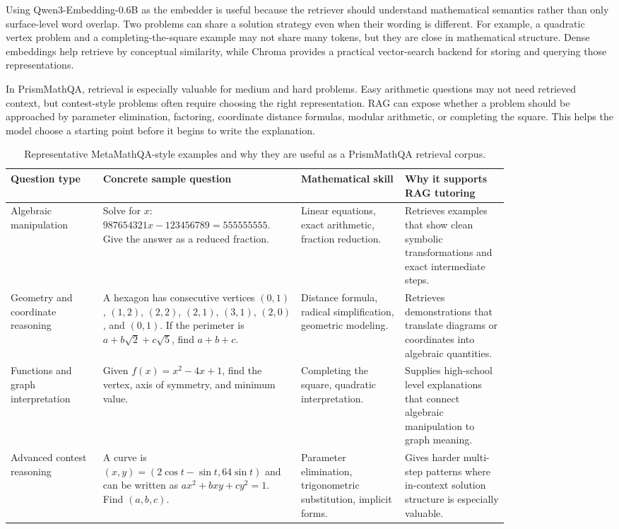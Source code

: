 Using Qwen3-Embedding-0.6B as the embedder is useful because the retriever should understand mathematical semantics rather than only surface-level word overlap. Two problems can share a solution strategy even when their wording is different. For example, a quadratic vertex problem and a completing-the-square example may not share many tokens, but they are close in mathematical structure. Dense embeddings help retrieve by conceptual similarity, while Chroma provides a practical vector-search backend for storing and querying those representations.

In PrismMathQA, retrieval is especially valuable for medium and hard problems. Easy arithmetic questions may not need retrieved context, but contest-style problems often require choosing the right representation. RAG can expose whether a problem should be approached by parameter elimination, factoring, coordinate distance formulas, modular arithmetic, or completing the square. This helps the model choose a starting point before it begins to write the explanation.

\begin{table}[t]
\centering
\caption{Representative MetaMathQA-style examples and why they are useful as a PrismMathQA retrieval corpus.}
\label{tab:metamathqa-corpus}
\small
\begin{tabular}{p{0.16\linewidth}p{0.30\linewidth}p{0.18\linewidth}p{0.18\linewidth}}
\toprule
Question type & Concrete sample question & Mathematical skill & Why it supports RAG tutoring \\
\midrule
Algebraic manipulation & Solve for $x$: $987654321x-123456789=555555555$. Give the answer as a reduced fraction. & Linear equations, exact arithmetic, fraction reduction. & Retrieves examples that show clean symbolic transformations and exact intermediate steps. \\
\midrule
Geometry and coordinate reasoning & A hexagon has consecutive vertices \((0,1)\), \((1,2)\), \((2,2)\), \((2,1)\), \((3,1)\), \((2,0)\), and \((0,1)\). If the perimeter is $a+b\sqrt{2}+c\sqrt{5}$, find $a+b+c$. & Distance formula, radical simplification, geometric modeling. & Retrieves demonstrations that translate diagrams or coordinates into algebraic quantities. \\
\midrule
Functions and graph interpretation & Given $f(x)=x^2-4x+1$, find the vertex, axis of symmetry, and minimum value. & Completing the square, quadratic interpretation. & Supplies high-school level explanations that connect algebraic manipulation to graph meaning. \\
\midrule
Advanced contest reasoning & A curve is $(x,y)=(2\cos t-\sin t,64\sin t)$ and can be written as $ax^2+bxy+cy^2=1$. Find $(a,b,c)$. & Parameter elimination, trigonometric substitution, implicit forms. & Gives harder multi-step patterns where in-context solution structure is especially valuable. \\
\bottomrule
\end{tabular}
\end{table}

